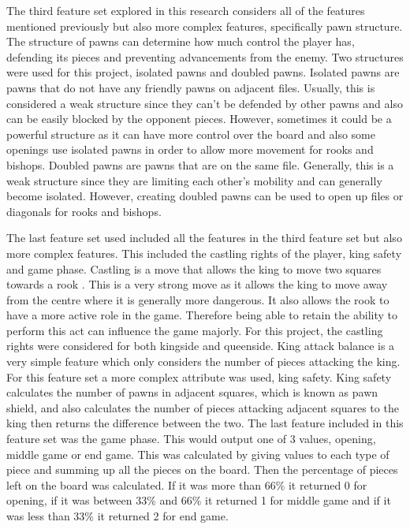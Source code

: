 The third feature set explored in this research considers all of the features mentioned previously but also more complex features, specifically pawn structure. The structure of pawns can determine how much control the player has, defending its pieces and preventing advancements from the enemy. Two structures were used for this project, isolated pawns and doubled pawns. Isolated pawns are pawns that do not have any friendly pawns on adjacent files. Usually, this is considered a weak structure since they can't be defended by other pawns and also can be easily blocked by the opponent pieces. However, sometimes it could be a powerful structure as it can have more control over the board and also some openings use isolated pawns in order to allow more movement for rooks and bishops. 
Doubled pawns are pawns that are on the same file. Generally, this is a weak structure since they are limiting each other's mobility and can generally become isolated. However, creating doubled pawns can be used to open up files or diagonals for rooks and bishops.

The last feature set used included all the features in the third feature set but also more complex features. This included the castling rights of the player, king safety and game phase. Castling is a move that allows the king to move two squares towards a rook \cite{Castling2025}. This is a very strong move as it allows the king to move away from the centre where it is generally more dangerous. It also allows the rook to have a more active role in the game. Therefore being able to retain the ability to perform this act can influence the game majorly. For this project, the castling rights were considered for both kingside and queenside. King attack balance is a very simple feature which only considers the number of pieces attacking the king.  For this feature set a more complex attribute was used, king safety. King safety calculates the number of pawns in adjacent squares, which is known as pawn shield, and also calculates the number of pieces attacking adjacent squares to the king then returns the difference between the two. The last feature included in this feature set was the game phase. This would output one of 3 values, opening, middle game or end game. This was calculated by giving values to each type of piece and summing up all the pieces on the board. Then the percentage of pieces left on the board was calculated. If it was more than 66\% it returned 0 for opening, if it was between 33\% and 66\% it returned 1 for middle game and if it was less than 33\% it returned 2 for end game.

